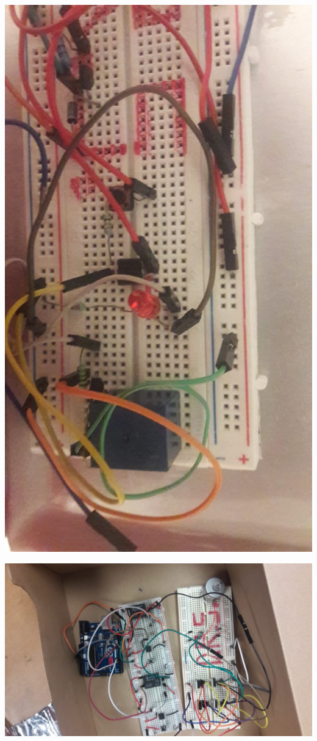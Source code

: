\documentclass[12pt,a4paper]{article}
\begin{document}
\begin{flushleft}
\includegraphics[width=15cm]{3.jpeg} 
\end{flushleft}
\begin{flushleft}
\includegraphics[width=15cm]{4.jpeg} 
\end{flushleft}
\end{document}
